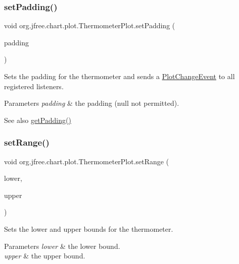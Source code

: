 \subsubsection{\texorpdfstring{set\+Padding()}{setPadding()}}
{\footnotesize\ttfamily void org.\+jfree.\+chart.\+plot.\+Thermometer\+Plot.\+set\+Padding (\begin{DoxyParamCaption}\item[{Rectangle\+Insets}]{padding }\end{DoxyParamCaption})}

Sets the padding for the thermometer and sends a \mbox{\hyperlink{}{Plot\+Change\+Event}} to all registered listeners.


\begin{DoxyParams}{Parameters}
{\em padding} & the padding ({\ttfamily null} not permitted).\\
\hline
\end{DoxyParams}
\begin{DoxySeeAlso}{See also}
\mbox{\hyperlink{classorg_1_1jfree_1_1chart_1_1plot_1_1_thermometer_plot_ae13b7526bb60e9b130430b510bd39d49}{get\+Padding()}} 
\end{DoxySeeAlso}
\mbox{\label{classorg_1_1jfree_1_1chart_1_1plot_1_1_thermometer_plot_aea60c0178fc6d469fe63bbf5fadf4c4c}} 
\subsubsection{\texorpdfstring{set\+Range()}{setRange()}}
{\footnotesize\ttfamily void org.\+jfree.\+chart.\+plot.\+Thermometer\+Plot.\+set\+Range (\begin{DoxyParamCaption}\item[{double}]{lower,  }\item[{double}]{upper }\end{DoxyParamCaption})}

Sets the lower and upper bounds for the thermometer.


\begin{DoxyParams}{Parameters}
{\em lower} & the lower bound. \\
\hline
{\em upper} & the upper bound. \\
\hline
\end{DoxyParams}
\mbox{\label{classorg_1_1jfree_1_1chart_1_1plot_1_1_thermometer_plot_a1b5f371cd3f13e37737f09372ba85fa9}} 
